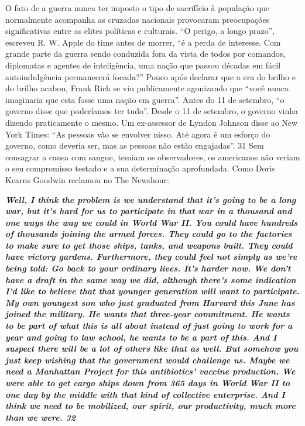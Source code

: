 O fato de a guerra nunca ter imposto o tipo de sacrifício à população que normalmente acompanha as cruzadas nacionais provocaram preocupações significativas entre as elites políticas e culturais. “O perigo, a longo prazo”, escreveu R. W. Apple do time antes de morrer, “é a perda de interesse. Com grande parte da guerra sendo conduzida fora da vista de todos por comandos, diplomatas e agentes de inteligência, uma nação que passou décadas em fácil autoindulgência permanecerá focada?” Pouco após declarar que a era do brilho e do brilho acabou, Frank Rich se viu publicamente agonizando que “você nunca imaginaria que esta fosse uma nação em guerra”. Antes do 11 de setembro, “o governo disse que poderíamos ter tudo”. Desde o 11 de setembro, o governo vinha dizendo praticamente o mesmo. Um ex-assessor de Lyndon Johnson disse ao New York Times: “As pessoas vão se envolver nisso. Até agora é um esforço do governo, como deveria ser, mas as pessoas não estão engajadas”.
 {\color{blue} 31}  
Sem consagrar a causa com sangue, temiam os observadores, os americanos não veriam o seu compromisso testado e a sua determinação aprofundada. Como Doris Kearns Goodwin reclamou no The Newshour:
 
\par
 

 \textbf{\textit{Well, I think the problem is we understand that it’s going to be a long war, but it’s hard for us to participate in that war in a thousand and one ways the way we could in World War II. You could have hundreds of thousands joining the armed forces. They could go to the factories to make sure to get those ships, tanks, and weapons built. They could have victory gardens. Furthermore, they could feel not simply as we’re being told: Go back to your ordinary lives. It’s harder now. We don’t have a draft in the same way we did, although there’s some indication I’d like to believe that that younger generation will want to participate. My own youngest son who just graduated from Harvard this June has joined the military. He wants that three-year commitment. He wants to be part of what this is all about instead of just going to work for a year and going to law school, he wants to be a part of this. And I suspect there will be a lot of others like that as well. But somehow you just keep wishing that the government would challenge us. Maybe we need a Manhattan Project for this antibiotics' vaccine production. We were able to get cargo ships down from {{\color{blue} 365} } days in World War II to one day by the middle with that kind of collective enterprise. And I think we need to be mobilized, our spirit, our productivity, much more than we were. {{\color{blue} 32} } } }  
 
